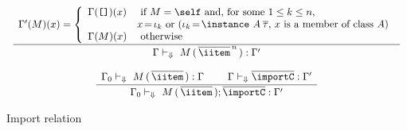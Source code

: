 \begin{figure}
\begin{mdframed}
\[ \begin{array}{cc}
	\displaystyle\frac
	 {\begin{array}{ll}
            \Gamma'(M)(x) = \left\{ \begin{array}{ll}
              \Gamma(\texttt{[]})(x) & \text{ if } M = \self \text{ and, for some $1 \leq k \leq n$, }\\
                                     & %
                                         x\hspace*{-.05cm} =\hspace*{-.05cm} \iota_k \text{ or 
                                         ($\iota_k\hspace*{-.05cm} =\hspace*{-.05cm} \instance\ A\: \overline{\tau}$, $x$ is a member of class $A$)}\\
               \Gamma(M)(x)          & \text{ otherwise}
             \end{array}\right.
          \end{array}}
	 {\Gamma \vdash_{\Downarrow} \ M\, (\,\overline{\iitem}^{\,n}\,) : \Gamma'}  \\\ \\

	\displaystyle\frac
	 {\begin{array}{ll}
	   \Gamma_0 \vdash_{\Downarrow} \ M\, (\,\overline{\iitem}\,) : \Gamma \:\:\: & \:\:\: 
           \Gamma \vdash_{\Downarrow} \overline{\importC} : \Gamma'
          \end{array}}
	 {\Gamma_0 \vdash_{\Downarrow} \ M\, (\,\overline{\iitem}\,); \overline{\importC} : \Gamma'} 
\end{array} \]
\end{mdframed} \vspace{-.3cm}
\caption{Import relation}
\label{fig:import-relation}
\end{figure} 

